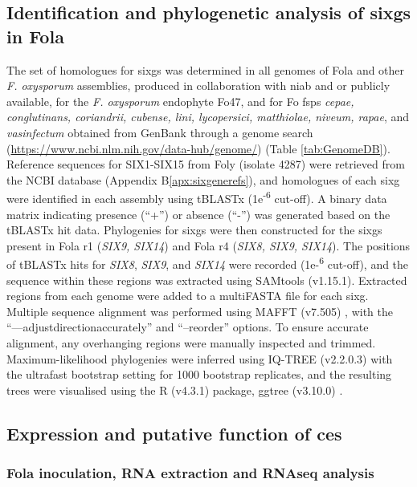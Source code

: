 \subsection{Identification and phylogenetic analysis of \aclp{sixg} in \acl{Fola}}

The set of homologues for \acp{sixg} was determined in all genomes of \ac{Fola} and other \textit{F. oxysporum} assemblies, produced in collaboration with \ac{niab} and or publicly available, for the \textit{F. oxysporum} endophyte Fo47, and for \ac{Fo} \acp{fsp} \textit{cepae, conglutinans, coriandrii, cubense, lini, lycopersici, matthiolae, niveum, rapae}, and \textit{vasinfectum} obtained from GenBank through a genome search (\href{https://www.ncbi.nlm.nih.gov/data-hub/genome/}{https://www.ncbi.nlm.nih.gov/data-hub/genome/}) (Table \ref{tab:GenomeDB}). Reference sequences for SIX1-SIX15 from \ac{Foly} (isolate 4287) were retrieved from the NCBI database (Appendix B\ref{apx:sixgenerefs}), and homologues of each \ac{sixg} were identified in each assembly using tBLASTx (1e\textsuperscript{-6} cut-off). A binary data matrix indicating presence (“+”) or absence (“-”) was generated based on the tBLASTx hit data. Phylogenies for \acp{sixg} were then constructed for the \acp{sixg} present in \ac{Fola} \ac{r1} (\textit{SIX9, SIX14}) and \ac{Fola} \ac{r4} (\textit{SIX8, SIX9, SIX14}). The positions of tBLASTx hits for \textit{SIX8}, \textit{SIX9}, and \textit{SIX14} were recorded (1e-\textsuperscript{6} cut-off), and the sequence within these regions was extracted using SAMtools (v1.15.1). Extracted regions from each genome were added to a multiFASTA file for each \ac{sixg}. Multiple sequence alignment was performed using MAFFT (v7.505) \parencite{Katoh2019}, with the “—adjustdirectionaccurately” and “–reorder” options. To ensure accurate alignment, any overhanging regions were manually inspected and trimmed. Maximum-likelihood phylogenies were inferred using IQ-TREE (v2.2.0.3) \parencite{Nguyen2015} with the ultrafast bootstrap setting for 1000 bootstrap replicates, and the resulting trees were visualised using the R (v4.3.1)  \parencite{R} package, ggtree (v3.10.0) \parencite{ggtree}.


\subsection{Expression and putative function of \aclp{ce}}

\subsubsection{\Acf{Fola} inoculation, RNA extraction and RNAseq analysis}
\label{RNAseqEffectors}


